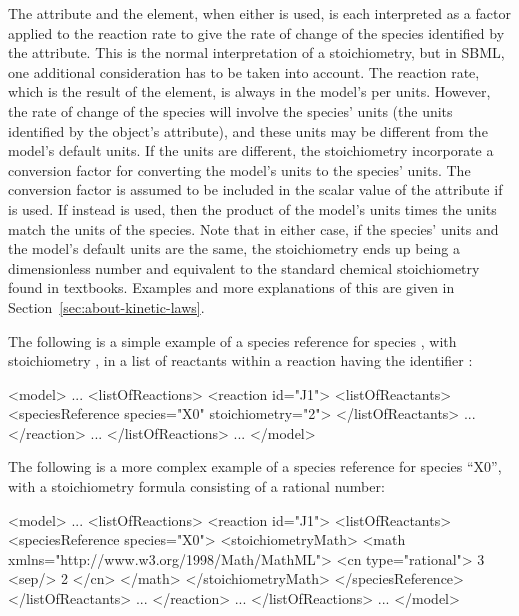 The  attribute and the
 element, when either is used, is each
interpreted as a factor applied to the reaction rate to give the
rate of change of the species identified by the 
attribute.  This is the normal interpretation of a stoichiometry,
but in SBML, one additional consideration has to be taken into
account.  The reaction rate, which is the result of the
\KineticLaw {} element, is always in the model's
 per  units.  However, the rate
of change of the species will involve the species'
 units (\ie the units identified by the
\Species object's  attribute), and these
units may be different from the model's default
 units.  If the units are different, the
stoichiometry  incorporate a conversion factor for converting
the model's  units to the species'
 units.  The conversion factor is assumed to
be included in the scalar value of the 
attribute if  is used.  If instead
 is used, then the product of the model's
 units times the 
units  match the  units of the species.
Note that in either case, if the species' units and the model's
default  units are the same, the stoichiometry
ends up being a dimensionless number and equivalent to the
standard chemical stoichiometry found in textbooks.  Examples and
more explanations of this are given in
Section~\ref{sec:about-kinetic-laws}.

The following is a simple example of a species reference for
species , with stoichiometry , in a list of
reactants within a reaction having the identifier :

\begin{example}
<model>
    ...
    <listOfReactions>
        <reaction id="J1">
            <listOfReactants>
                <speciesReference species="X0" stoichiometry="2">
            </listOfReactants>
            ...
        </reaction>
        ...
    </listOfReactions>
    ...
</model>
\end{example}

The following is a more complex example of a species reference for
species ``X0'', with a stoichiometry formula consisting of
a rational number:

\begin{example}
<model>
    ...
    <listOfReactions>
        <reaction id="J1">
            <listOfReactants>
                <speciesReference species="X0">
                    <stoichiometryMath>
                        <math xmlns="http://www.w3.org/1998/Math/MathML"> 
                            <cn type="rational"> 3 <sep/> 2 </cn>
                        </math>
                    </stoichiometryMath>
                </speciesReference>
            </listOfReactants>
            ...
        </reaction>
        ...
    </listOfReactions>
    ...
</model>
\end{example}

